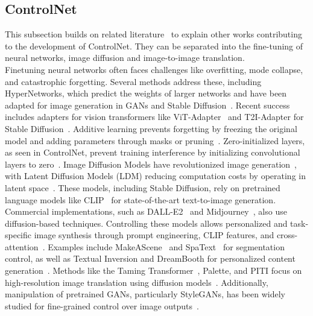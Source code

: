 \subsection{ControlNet}
This subsection builds on related literature~\cite{zhang2023addingconditionalcontroltexttoimage} 
to explain other works contributing to the development of ControlNet. They can be separated into
the fine-tuning of neural networks, image diffusion and image-to-image translation.
\\
Finetuning neural networks often faces challenges like overfitting, mode collapse, and catastrophic forgetting. Several methods address these, including HyperNetworks, which predict the weights of larger networks and have been adapted for image generation in GANs and Stable Diffusion~\cite{rombach2022stablediffusion}. Recent success includes adapters for vision transformers like ViT-Adapter~\cite{chen2023visiontransformeradapterdense} and T2I-Adapter for Stable Diffusion~\cite{mou2023t2iadapterlearningadaptersdig}. Additive learning prevents forgetting by freezing the original model and adding parameters through masks or pruning~\cite{mallya2018piggybackadaptingsinglenetwork, rosenfeld2018incrementallearningdeepadaptation, mallya2018packnetaddingmultipletasks}. Zero-initialized layers, as seen in ControlNet, prevent training interference by initializing convolutional layers to zero~\cite{lecun2015deeplearning,rombach2022stablediffusion, karras2018progressivegrowinggansimproved}. Image Diffusion Models have revolutionized image generation~\cite{sohldickstein2015deepunsupervisedlearningusing}, with Latent Diffusion Models (LDM) reducing computation costs by operating in latent space~\cite{rombach2022stablediffusion}. These models, including Stable Diffusion, rely on pretrained language models like CLIP~\cite{radford2021learningtransferablevisualmodels} for state-of-the-art text-to-image generation. Commercial implementations, such as DALL-E2~\cite{2023dalle2} and Midjourney~\cite{2023midjourney}, also use diffusion-based techniques. Controlling these models allows personalized and task-specific image synthesis through prompt engineering, CLIP features, and cross-attention~\cite{parmar2023zeroshotimagetoimagetranslation}. Examples include MakeAScene~\cite{gafni2022makeascenescenebasedtexttoimagegeneration} and SpaText~\cite{Avrahami_2023} for segmentation control, as well as Textual Inversion and DreamBooth for personalized content generation~\cite{gal2022imageworthwordpersonalizing, ruiz2023dreamboothfinetuningtexttoimage}. Methods like the Taming Transformer~\cite{esser2021tamingtransformershighresolutionimage}, Palette, and PITI focus on high-resolution image translation using diffusion models~\cite{saharia2022paletteimagetoimagediffusionmodels, wang2022pretrainingneedimagetoimagetranslation}. Additionally, manipulation of pretrained GANs, particularly StyleGANs, has been widely studied for fine-grained control over image outputs~\cite{richardson2021encodingstylestyleganencoder}.

